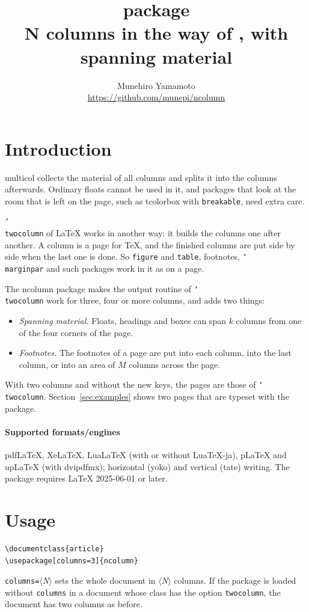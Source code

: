 \documentclass{article}
\title{\pkg{ncolumn} package\\
  \large N columns in the way of \cs{twocolumn}, with spanning material}
\author{Munehiro Yamamoto\\
  \url{https://github.com/munepi/ncolumn}}
\date{\ncolversion}
\newcommand*\cs[1]{\texttt{\char`\\#1}}
\newcommand*\pkg[1]{\textsf{#1}}
\newcommand*\key[1]{\texttt{#1}}
\newcommand*\meta[1]{$\langle$\textit{#1}$\rangle$}
\begin{document}
\maketitle

\section{Introduction}

\pkg{multicol} collects the material of all columns and splits it into
the columns afterwards.  Ordinary floats cannot be used in it, and
packages that look at the room that is left on the page, such as
\pkg{tcolorbox} with \key{breakable}, need extra care.

\cs{twocolumn} of \LaTeX{} works in another way: it builds the columns
one after another.  A column is a page for \TeX, and the finished
columns are put side by side when the last one is done.  So
\texttt{figure} and \texttt{table}, footnotes, \cs{marginpar} and such
packages work in it as on a page.

The \pkg{ncolumn} package makes the output routine of \cs{twocolumn}
work for three, four or more columns, and adds two things:
\begin{itemize}
\item \emph{Spanning material.}  Floats, headings and boxes can span
  $k$ columns from one of the four corners of the page.
\item \emph{Footnotes.}  The footnotes of a page are put into each
  column, into the last column, or into an area of $M$ columns across
  the page.
\end{itemize}
With two columns and without the new keys, the pages are those of
\cs{twocolumn}.  Section~\ref{sec:examples} shows two pages that are
typeset with the package.

\paragraph{Supported formats/engines}
pdf\LaTeX, Xe\LaTeX, Lua\LaTeX{} (with or without Lua\TeX-ja),
p\LaTeX{} and up\LaTeX{} (with dvipdfmx); horizontal (yoko) and
vertical (tate) writing.  The package requires \LaTeX{} 2025-06-01 or
later.

\section{Usage}

\begin{verbatim}
\documentclass{article}
\usepackage[columns=3]{ncolumn}
\end{verbatim}
\key{columns=}\meta{N} sets the whole document in \meta{N} columns.
If the package is loaded without \key{columns} in a document whose
class has the option \key{twocolumn}, the document has two columns as
before.
\end{document}
